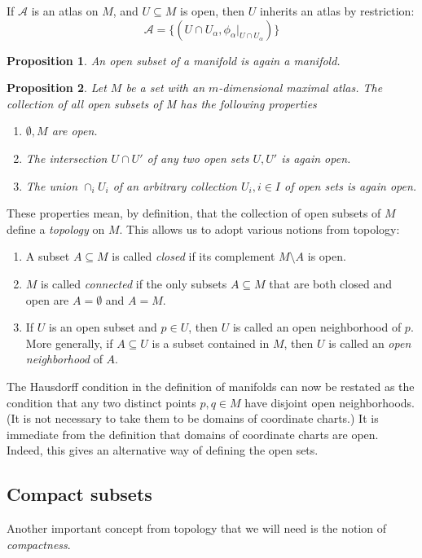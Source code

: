 \documentclass{article}
\newtheorem{proposition}{Proposition}[theorem]
\theoremstyle{definition}
\begin{document}
If $\mathscr{A}$  is an atlas on $M$, and $U \subseteq M$ is open, then $U$ inherits an atlas by restriction:
\[
    \mathscr{A}  = \{ (U \cap U_\alpha, \phi_\alpha |_{U \cap U_\alpha } ) \}
\]

\begin{proposition}
An open subset of a manifold is again a manifold.
\end{proposition}

\begin{proposition}
Let $M$ be a set with an $m$-dimensional maximal atlas. The collection of all open subsets of M has the following properties
\begin{enumerate}
    \item $\emptyset, M$ are open.
    \item The intersection $U \cap U'$ of any two open sets $U,U'$ is again open.
    \item The union $\cap_i U_i$ of an arbitrary collection $U_i, i \in I$ of open sets is again open.
\end{enumerate}
\end{proposition}


These properties mean, by definition, that the collection of open subsets of $M$ define a \textit{topology} on $M$. This allows us to adopt various notions from topology:

\begin{enumerate}
    \item A subset $A \subseteq M$ is called \textit{closed} if its complement $M \setminus A$ is open.
    \item $M$ is called \textit{connected} if the only subsets $A \subseteq M$ that are both closed and open are $A = \emptyset$ and $A = M$.
    \item If $U$ is an open subset and $p \in U$, then $U$ is called an open neighborhood of $p$. More generally, if $A \subseteq U$ is a subset contained in $M$, then $U$ is called an \textit{open neighborhood} of $A$.
\end{enumerate}

The Hausdorff condition in the definition of manifolds can now be restated as the condition that any two distinct points $p,q \in M$ have disjoint open neighborhoods. (It is not necessary to take them to be domains of coordinate charts.) It is immediate from the definition that domains of coordinate charts are open. Indeed, this gives an alternative way of defining the open sets.

\subsection{Compact subsets}
Another important concept from topology that we will need is the notion of \textit{compactness}.
\end{document}
